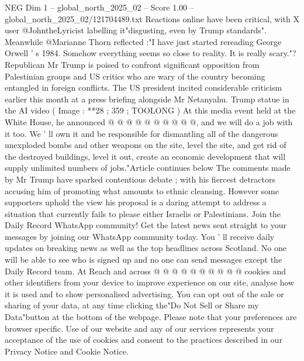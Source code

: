 \begin{textsample}{NEG Dim 1 – global\_north\_2025\_02 – Score 1.00 – global\_north\_2025\_02/121704489.txt}
Reactions online have been critical, with X user @JohntheLyricist labelling it"disgusting, even by Trump standards".
Meanwhile @Marianne Thorn reflected :"I have just started rereading George Orwell ' s 1984.
Somehow everything seems so close to reality.
It is really scary."?
Republican Mr Trump is poised to confront significant opposition from Palestinian groups and US critics who are wary of the country becoming entangled in foreign conflicts.
The US president incited considerable criticism earlier this month at a press briefing alongside Mr Netanyahu.
Trump statue in the AI video ( Image : **28 ; 359 ; TOOLONG ) At this media event held at the White House, he announced @ @ @ @ @ @ @ @ @ @, and we will do a job with it too.
We ' ll own it and be responsible for dismantling all of the dangerous unexploded bombs and other weapons on the site, level the site, and get rid of the destroyed buildings, level it out, create an economic development that will supply unlimited numbers of jobs."Article continues below The comments made by Mr Trump have sparked contentious debate ; with his fiercest detractors accusing him of promoting what amounts to ethnic cleansing.
However some supporters uphold the view his proposal is a daring attempt to address a situation that currently fails to please either Israelis or Palestinians.
Join the Daily Record WhatsApp community!
Get the latest news sent straight to your messages by joining our WhatsApp community today.
You ' ll receive daily updates on breaking news as well as the top headlines across Scotland.
No one will be able to see who is signed up and no one can send messages except the Daily Record team.
At Reach and across @ @ @ @ @ @ @ @ @ @ cookies and other identifiers from your device to improve experience on our site, analyse how it is used and to show personalised advertising.
You can opt out of the sale or sharing of your data, at any time clicking the"Do Not Sell or Share my Data"button at the bottom of the webpage.
Please note that your preferences are browser specific.
Use of our website and any of our services represents your acceptance of the use of cookies and consent to the practices described in our Privacy Notice and Cookie Notice.

\end{textsample}
